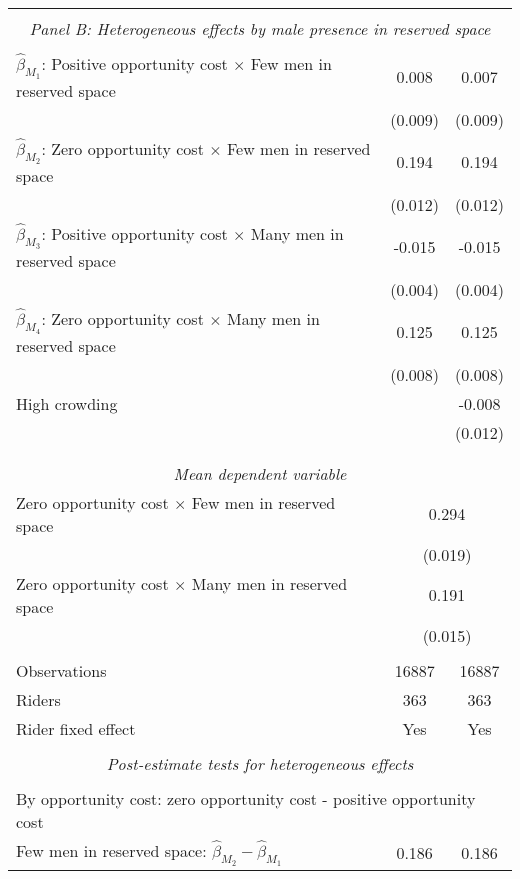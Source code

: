 \begin{tabular}{l*{2}{c}}
\hline \\[-1ex] \multicolumn{3}{c}{\textit{Panel B: Heterogeneous effects by male presence in reserved space}} \\\\[-1ex]
$\hat\beta_{M_1}$: Positive opportunity cost $\times$ Few men in reserved space&       0.008         &       0.007         \\
                    &     (0.009)         &     (0.009)         \\
[1em]
$\hat\beta_{M_2}$: Zero opportunity cost $\times$ Few men in reserved space&       0.194\sym{***}&       0.194\sym{***}\\
                    &     (0.012)         &     (0.012)         \\
[1em]
$\hat\beta_{M_3}$: Positive opportunity cost $\times$ Many men in reserved space&      -0.015\sym{***}&      -0.015\sym{***}\\
                    &     (0.004)         &     (0.004)         \\
[1em]
$\hat\beta_{M_4}$: Zero opportunity cost $\times$ Many men in reserved space&       0.125\sym{***}&       0.125\sym{***}\\
                    &     (0.008)         &     (0.008)         \\
[1em]
High crowding       &                     &      -0.008         \\
                    &                     &     (0.012)         \\
\\[-1.8ex] \hline \\[-1.8ex] \multicolumn{3}{c}{\textit{Mean dependent variable}} \\ Zero opportunity cost $\times$ Few men in reserved space & \multicolumn{2}{c}{0.294} \\ & \multicolumn{2}{c}{(0.019)} \\ Zero opportunity cost $\times$ Many men in reserved space & \multicolumn{2}{c}{0.191} \\ & \multicolumn{2}{c}{(0.015)} \\\\[-1ex] 
Observations        &       16887         &       16887         \\
Riders              &         363         &         363         \\
Rider fixed effect  &         Yes         &         Yes         \\
\hline \\[-1ex]  \multicolumn{3}{c}{\textit{Post-estimate tests for heterogeneous effects}} \\\\[-1ex] \multicolumn{3}{l}{By opportunity cost: zero opportunity cost - positive opportunity cost} \\ \quad Few men in reserved space: $\hat\beta_{M_2} - \hat\beta_{M_1}$&       0.186         &       0.186         \\

\end{tabular}
